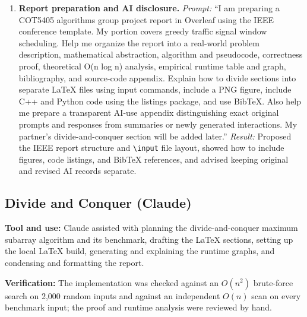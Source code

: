\begin{enumerate}
\item \textbf{Report preparation and AI disclosure.}
\emph{Prompt:} ``I am preparing a COT5405 algorithms
group project report in Overleaf using the IEEE
conference template. My portion covers greedy traffic
signal window scheduling. Help me organize the report
into a real-world problem description, mathematical
abstraction, algorithm and pseudocode, correctness
proof, theoretical O(n log n) analysis, empirical
runtime table and graph, bibliography, and source-code
appendix. Explain how to divide sections into separate
LaTeX files using input commands, include a PNG figure,
include C++ and Python code using the listings package,
and use BibTeX. Also help me prepare a transparent AI-use
appendix distinguishing exact original prompts and
responses from summaries or newly generated
interactions. My partner's divide-and-conquer section
will be added later.''
\emph{Result:} Proposed the IEEE report structure and
\texttt{\textbackslash input} file layout, showed how to
include figures, code listings, and BibTeX references,
and advised keeping original and revised AI records
separate.

\end{enumerate}

\subsection{Divide and Conquer (Claude)}

\noindent\textbf{Tool and use:} Claude assisted
with planning the divide-and-conquer
maximum subarray algorithm and its benchmark, drafting
the LaTeX sections, setting up the local LaTeX build,
generating and explaining the runtime graphs, and
condensing and formatting the report.

\noindent\textbf{Verification:} The implementation was
checked against an $O(n^2)$ brute-force search on 2,000
random inputs and against an independent $O(n)$ scan on
every benchmark input; the proof and runtime analysis
were reviewed by hand.

